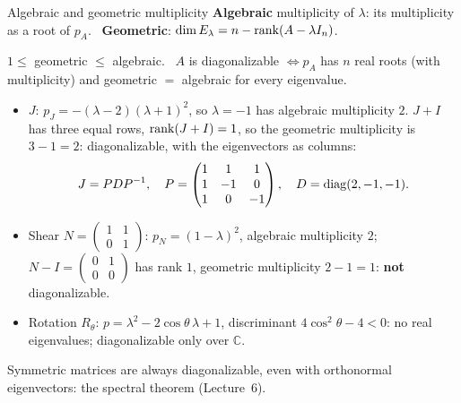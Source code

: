 \documentclass[aspectratio=1610,11pt]{beamer}
\begin{document}

\begin{frame}{Algebraic and geometric multiplicity}
    \small
    \textbf{Algebraic} multiplicity of $\lambda$: its multiplicity as a root of $p_A$. \ \textbf{Geometric}: $\dim E_\lambda = n - \operatorname{rank}(A - \lambda I_n)$.
    \begin{theorem}
        \small $1 \leq$ geometric $\leq$ algebraic. \ $A$ is diagonalizable $\iff p_A$ has $n$ real roots (with multiplicity) and geometric $=$ algebraic for every eigenvalue.
    \end{theorem}
    \begin{itemize}
        \item $J$: $p_J = -(\lambda - 2)(\lambda + 1)^2$, so $\lambda = -1$ has algebraic multiplicity $2$. $J + I$ has three equal rows, $\operatorname{rank}(J + I) = 1$, so the geometric multiplicity is $3 - 1 = 2$: diagonalizable, with the eigenvectors as columns:
        \[J = PDP^{-1}, \quad P = \begin{pmatrix} 1 & 1 & 1 \\ 1 & -1 & 0 \\ 1 & 0 & -1 \end{pmatrix}, \quad D = \operatorname{diag}(2, -1, -1).\]
        \item Shear $N = \begin{pmatrix} 1 & 1 \\ 0 & 1 \end{pmatrix}$: $p_N = (1 - \lambda)^2$, algebraic multiplicity $2$; \ $N - I = \begin{pmatrix} 0 & 1 \\ 0 & 0 \end{pmatrix}$ has rank $1$, geometric multiplicity $2 - 1 = 1$: \textbf{not} diagonalizable.
        \item Rotation $R_\theta$: $p = \lambda^2 - 2\cos\theta\,\lambda + 1$, discriminant $4\cos^2\theta - 4 < 0$: no real eigenvalues; diagonalizable only over $\mathbb{C}$.
    \end{itemize}
    Symmetric matrices are always diagonalizable, even with orthonormal eigenvectors: the spectral theorem (Lecture~6).
\end{frame}
\end{document}
